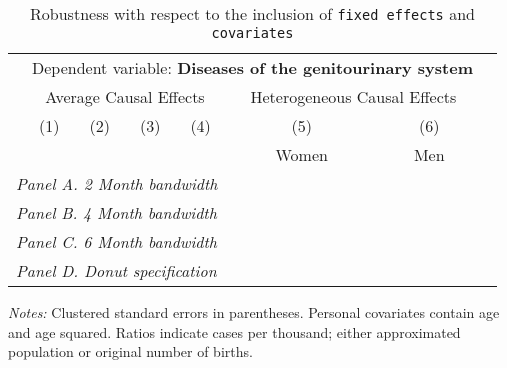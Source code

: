  \begin{table}[H] \begin{threeparttable} \centering \caption{Robustness with respect to the inclusion of \texttt{fixed effects} and \texttt{covariates}} {\def\sym#1{\ifmmode^{#1}\else\(^{#1}\)\fi} \begin{tabular}{l*{7}{c}} \toprule & \multicolumn{6}{c}{Dependent variable: \textbf{Diseases of the genitourinary system}} \\ \cmidrule(lr){2-7}
            &\multicolumn{4}{c}{Average Causal Effects}         &\multicolumn{2}{c}{Heterogeneous Causal Effects}\\\cmidrule(lr){2-5}\cmidrule(lr){6-7}
            &\multicolumn{1}{c}{(1)}&\multicolumn{1}{c}{(2)}&\multicolumn{1}{c}{(3)}&\multicolumn{1}{c}{(4)}&\multicolumn{1}{c}{(5)}&\multicolumn{1}{c}{(6)}\\
            &\multicolumn{1}{c}{}&\multicolumn{1}{c}{}&\multicolumn{1}{c}{}&\multicolumn{1}{c}{}&\multicolumn{1}{c}{Women}&\multicolumn{1}{c}{Men}\\
\midrule
 \multicolumn{7}{l}{\emph{Panel A. 2 Month bandwidth}} \\    \midrule\multicolumn{7}{l}{\emph{Panel B. 4 Month bandwidth}} \\    \midrule\multicolumn{7}{l}{\emph{Panel C. 6 Month bandwidth}} \\    \midrule\multicolumn{7}{l}{\emph{Panel D. Donut specification}} \\    \midrule  
\bottomrule \end{tabular} } \begin{tablenotes} \item \scriptsize \emph{Notes:} Clustered standard errors in parentheses. Personal covariates contain age and age squared. Ratios indicate cases per thousand; either approximated population or original number of births. \end{tablenotes} \end{threeparttable} \end{table} 
